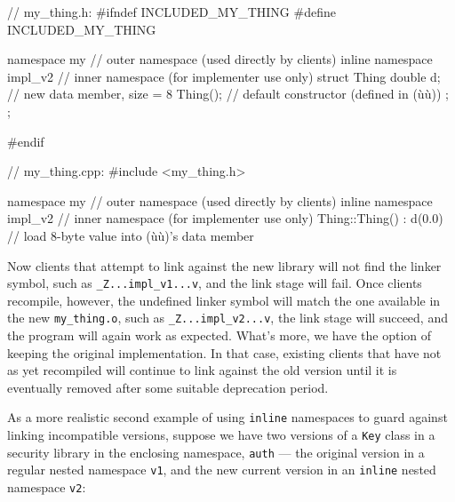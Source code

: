 \begin{emcppshiddenlisting}[emcppsbatch=e5]
// my_thing.h:
#ifndef INCLUDED_MY_THING
#define INCLUDED_MY_THING

namespace my                  // outer namespace (used directly by clients)
{
    inline namespace impl_v2  // inner namespace (for implementer use only)
    {
        struct Thing
        {
            double d; // new data member, size = 8
            Thing();  // default constructor (defined in (ù{}ù))
        };
    };
}

#endif
\end{emcppshiddenlisting}
\begin{emcppslisting}[emcppsbatch=e5]
// my_thing.cpp:
#include <my_thing.h>

namespace my                     // outer namespace (used directly by clients)
{
    inline namespace impl_v2     // inner namespace (for implementer use only)
    {
        Thing::Thing() : d(0.0)  // load 8-byte value into (ù{}ù)'s data member
        {
        }
    }
}
\end{emcppslisting}

\noindent Now clients that attempt to link against the new library will not find
the linker symbol, such as \lstinline!_Z...impl_v1...v!, and the link
stage will fail. Once clients recompile, however, the undefined linker
symbol will match the one available in the new \lstinline!my_thing.o!,
such as \lstinline!_Z...impl_v2...v!, the link stage will succeed, and
the program will again work as expected. What's more, we have the option
of keeping the original implementation. In that case, existing clients
that have not as yet recompiled will continue to link against the old
version until it is eventually removed after some suitable deprecation
period.

As a more realistic second example of using \lstinline!inline! namespaces
to guard against linking incompatible versions, suppose we have two
versions of a \lstinline!Key! class in a security library in the enclosing
namespace, \lstinline!auth! --- the original version in a regular nested
namespace \lstinline!v1!, and the new current version in an \lstinline!inline!
nested namespace \lstinline!v2!:

